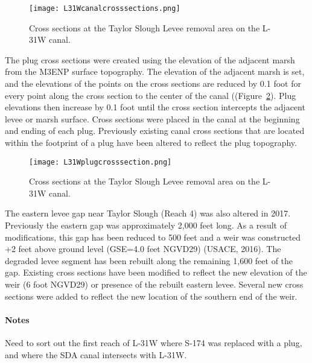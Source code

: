 \begin{figure}[!h]
  \begin{center}
  \texttt{[image: L31Wcanalcrosssections.png]}
  \caption[Cross sections at the Taylor Slough Levee removal area on the L-31W canal.]{Cross sections at the Taylor Slough Levee removal area on the L-31W canal.}
  \label{fig:L31Wcanalcrosssections}
  \end{center}
\end{figure}


The plug cross sections were created using the elevation of the adjacent marsh from the M3ENP surface topography.  The elevation of the adjacent marsh is set, and the elevations of the points on the cross sections are reduced by 0.1 foot for every point along the cross section to the center of the canal ((Figure~\ref{fig:L31Wplugcrosssection}).  Plug elevations then increase by 0.1 foot until the cross section intercepts the adjacent levee or marsh surface.  Cross sections were placed in the canal at the beginning and ending of each plug.  Previously existing canal cross sections that are located within the footprint of a plug have been altered to reflect the plug topography.

\begin{figure}[!h]
  \begin{center}
  \texttt{[image: L31Wplugcrosssection.png]}
  \caption[Cross sections at the Taylor Slough Levee removal area on the L-31W canal.]{Cross sections at the Taylor Slough Levee removal area on the L-31W canal.}
  \label{fig:L31Wplugcrosssection}
  \end{center}
\end{figure}


The eastern levee gap near Taylor Slough (Reach 4) was also altered in 2017.  Previously the eastern gap was approximately 2,000 feet long.  As a result of modifications, this gap has been reduced to 500 feet and a weir was constructed +2 feet above ground level (GSE=4.0 feet NGVD29) (USACE, 2016).  The degraded levee segment has been rebuilt along the remaining 1,600 feet of the gap.  Existing cross sections have been modified to reflect the new elevation of the weir (6 foot NGVD29) or presence of the rebuilt eastern levee.  Several new cross sections were added to reflect the new location of the southern end of the weir.



\begin{notes}
\paragraph{Notes}
Need to sort out the first reach of L-31W where S-174 was replaced with a plug, and where the SDA canal intersects with L-31W.
\end{notes}

